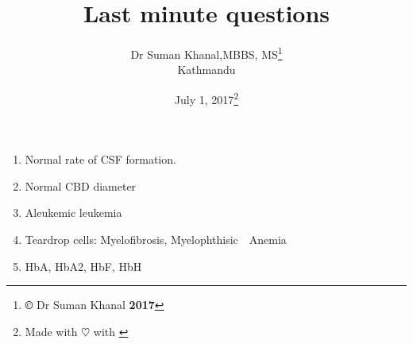 \documentclass[12pt]{article}
\title{Last minute questions}
\author{Dr Suman Khanal,MBBS, MS\footnote{\textbf{\copyright} Dr Suman Khanal \textbf{2017}}\\ Kathmandu}
\date{July 1, 2017\footnote{Made with $\heartsuit$ with \href{https://www.latex-project.org/}{\LaTeXe}}}
\begin{document}
\maketitle



\begin{enumerate}
	\item Normal rate of CSF formation.
	\item Normal CBD diameter
	\item Aleukemic leukemia
	\item Teardrop cells: Myelofibrosis, Myelophthisic Anemia
	\item HbA, HbA2, HbF, HbH
	
\end{enumerate}
\end{document}
